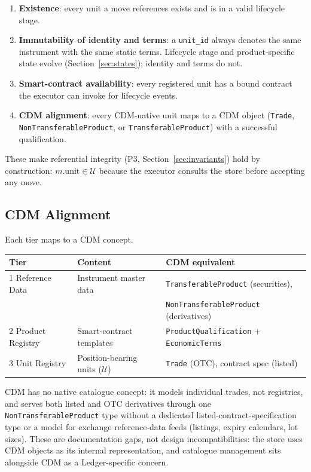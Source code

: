 \documentclass[11pt,a4paper]{article}
\begin{document}
\begin{enumerate}
\item \textbf{Existence}: every unit a move references exists and is in a valid lifecycle stage.
\item \textbf{Immutability of identity and terms}: a \texttt{unit\_id} always denotes the same instrument with the same static terms. Lifecycle stage and product-specific state evolve (Section~\ref{sec:states}); identity and terms do not.
\item \textbf{Smart-contract availability}: every registered unit has a bound contract the executor can invoke for lifecycle events.
\item \textbf{CDM alignment}: every CDM-native unit maps to a CDM object (\texttt{Trade}, \texttt{Non\allowbreak{}Transferable\allowbreak{}Product}, or \texttt{Transferable\allowbreak{}Product}) with a successful qualification.
\end{enumerate}

These make referential integrity (P3, Section~\ref{sec:invariants}) hold by construction: $m.\text{unit} \in \mathcal{U}$ because the executor consults the store before accepting any move.

\subsection{CDM Alignment}

Each tier maps to a CDM concept.

\begin{center}
\small
\begin{tabular}{lll}
\toprule
\textbf{Tier} & \textbf{Content} & \textbf{CDM equivalent} \\
\midrule
1 Reference Data & Instrument master data & \texttt{TransferableProduct} (securities), \\
 & & \texttt{NonTransferableProduct} (derivatives) \\
2 Product Registry & Smart-contract templates & \texttt{ProductQualification} + \texttt{EconomicTerms} \\
3 Unit Registry & Position-bearing units ($\mathcal{U}$) & \texttt{Trade} (OTC), contract spec (listed) \\
\bottomrule
\end{tabular}
\end{center}

CDM has no native catalogue concept: it models individual trades, not registries, and serves both listed and OTC derivatives through one \texttt{NonTransferableProduct} type without a dedicated listed-contract-specification type or a model for exchange reference-data feeds (listings, expiry calendars, lot sizes). These are documentation gaps, not design incompatibilities: the store uses CDM objects as its internal representation, and catalogue management sits alongside CDM as a Ledger-specific concern.
\end{document}
